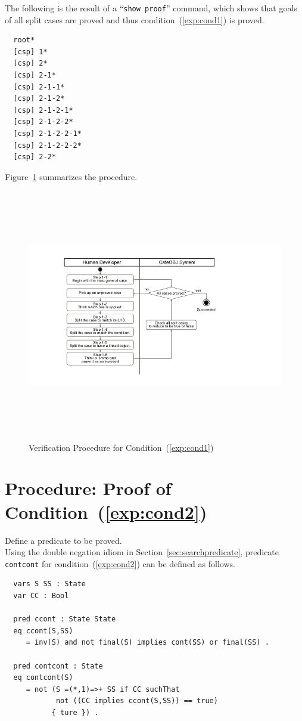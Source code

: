 \documentclass[12pt]{report}
\newcommand{\stt}[1]{{\small{\tt {#1}}}}
\begin{document}
The following is the result of a ``\stt{show proof}'' command, which shows
that goals of all split cases are proved and thus
condition~(\ref{exp:cond1}) is proved.
\begin{verbatim}
  root*
  [csp] 1*
  [csp] 2*
  [csp] 2-1*
  [csp] 2-1-1*
  [csp] 2-1-2*
  [csp] 2-1-2-1*
  [csp] 2-1-2-2*
  [csp] 2-1-2-2-1*
  [csp] 2-1-2-2-2*
  [csp] 2-2*
\end{verbatim}

Figure~\ref{fig:procedure1} summarizes the procedure.
\begin{figure}
\centering
\includegraphics[height=11cm,natwidth=720,natheight=405,clip,trim=100 55 190 40]{procedure1.png}
\caption{Verification Procedure for Condition~(\ref{exp:cond1})}
\label{fig:procedure1}
\end{figure}

\section{Procedure: Proof of Condition~(\ref{exp:cond2})}
\label{sec:contcont}
 Define a predicate to be proved. \\ Using the
double negation idiom in Section~\ref{sec:searchpredicate}, predicate
{\tt contcont} for condition~(\ref{exp:cond2}) can be defined as follows.
\begin{verbatim}
  vars S SS : State
  var CC : Bool

  pred ccont : State State
  eq ccont(S,SS)
     = inv(S) and not final(S) implies cont(SS) or final(SS) .

  pred contcont : State
  eq contcont(S)
     = not (S =(*,1)=>+ SS if CC suchThat
            not ((CC implies ccont(S,SS)) == true)
     	   { ture }) .
\end{verbatim}
\end{document}

